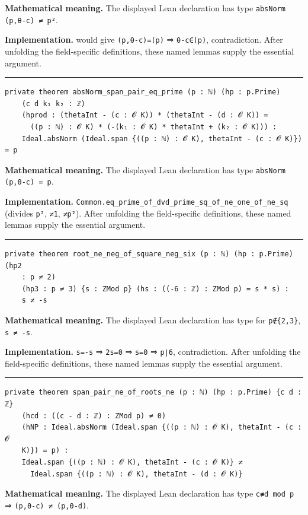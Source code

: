 \documentclass[UTF8,a4paper,11pt,fontset=fandol]{ctexart}
\theoremstyle{definition}
\newcommand{\statementsep}{\par\medskip\hrule\medskip}
\begin{document}
\noindent\textbf{Mathematical meaning.} The displayed Lean declaration has type \texttt{absNorm (p,θ-c) ≠ p²}.\par
\noindent\textbf{Implementation.} would give \texttt{(p,θ-c)=(p)} ⇒ \texttt{θ-c∈(p)}, contradiction. After unfolding the field-specific definitions, these named lemmas supply the essential argument.\par
\statementsep
\begin{verbatim}
private theorem absNorm_span_pair_eq_prime (p : ℕ) (hp : p.Prime)
    (c d k₁ k₂ : ℤ)
    (hprod : (thetaInt - (c : 𝓞 K)) * (thetaInt - (d : 𝓞 K)) =
      ((p : ℕ) : 𝓞 K) * (-(k₁ : 𝓞 K) * thetaInt + (k₂ : 𝓞 K))) :
    Ideal.absNorm (Ideal.span {((p : ℕ) : 𝓞 K), thetaInt - (c : 𝓞 K)}) = p
\end{verbatim}
\noindent\textbf{Mathematical meaning.} The displayed Lean declaration has type \texttt{absNorm (p,θ-c) = p}.\par
\noindent\textbf{Implementation.} \texttt{Common.\allowbreak{}eq\_\allowbreak{}prime\_\allowbreak{}of\_\allowbreak{}dvd\_\allowbreak{}prime\_\allowbreak{}sq\_\allowbreak{}of\_\allowbreak{}ne\_\allowbreak{}one\_\allowbreak{}of\_\allowbreak{}ne\_\allowbreak{}sq} (divides \texttt{p²}, \texttt{≠1}, \texttt{≠p²}). After unfolding the field-specific definitions, these named lemmas supply the essential argument.\par
\statementsep
\begin{verbatim}
private theorem root_ne_neg_of_square_neg_six (p : ℕ) (hp : p.Prime) (hp2
    : p ≠ 2)
    (hp3 : p ≠ 3) {s : ZMod p} (hs : ((-6 : ℤ) : ZMod p) = s * s) :
    s ≠ -s
\end{verbatim}
\noindent\textbf{Mathematical meaning.} The displayed Lean declaration has type for \texttt{p∉\{2,3\}}, \texttt{s ≠ -s}.\par
\noindent\textbf{Implementation.} \texttt{s=-s} ⇒ \texttt{2s=0} ⇒ \texttt{s=0} ⇒ \texttt{p∣6}, contradiction. After unfolding the field-specific definitions, these named lemmas supply the essential argument.\par
\statementsep
\begin{verbatim}
private theorem span_pair_ne_of_roots_ne (p : ℕ) (hp : p.Prime) {c d : ℤ}
    (hcd : ((c - d : ℤ) : ZMod p) ≠ 0)
    (hNP : Ideal.absNorm (Ideal.span {((p : ℕ) : 𝓞 K), thetaInt - (c : 𝓞
    K)}) = p) :
    Ideal.span {((p : ℕ) : 𝓞 K), thetaInt - (c : 𝓞 K)} ≠
      Ideal.span {((p : ℕ) : 𝓞 K), thetaInt - (d : 𝓞 K)}
\end{verbatim}
\noindent\textbf{Mathematical meaning.} The displayed Lean declaration has type \texttt{c≢d mod p} ⇒ \texttt{(p,θ-c) ≠ (p,θ-d)}.\par
\end{document}
